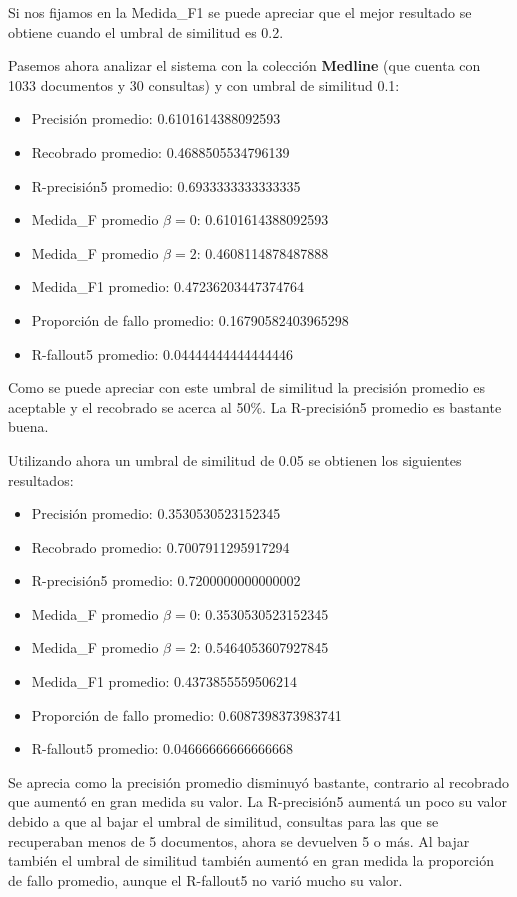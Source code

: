 \documentclass[runningheads]{llncs}
\begin{document}
Si nos fijamos en la Medida\_F1 se puede apreciar que el mejor resultado se obtiene cuando el umbral de similitud es 0.2.

Pasemos ahora analizar el sistema con la colecci\'on \textbf{Medline} (que cuenta con 1033 documentos y 30 consultas) y con umbral de similitud 0.1: 

\begin{itemize}
	\item Precisi\'on promedio:  0.6101614388092593
	\item Recobrado promedio:  0.4688505534796139
	\item R-precisi\'on5 promedio: 0.6933333333333335
	\item Medida\_F promedio  $ \beta=0 $:    0.6101614388092593
	\item Medida\_F promedio  $ \beta=2 $:  0.4608114878487888
	\item Medida\_F1 promedio:    0.47236203447374764
	\item Proporci\'on de fallo promedio: 0.16790582403965298
	\item R-fallout5 promedio:  0.04444444444444446
\end{itemize}

Como se puede apreciar con este umbral de similitud la precisi\'on promedio es aceptable y el recobrado se acerca al 50$\%$. La R-precisi\'on5 promedio es bastante buena.

Utilizando ahora un umbral de similitud de 0.05 se obtienen los siguientes resultados:

\begin{itemize}
	\item Precisi\'on promedio:  0.3530530523152345
	\item Recobrado promedio:  0.7007911295917294
	\item R-precisi\'on5 promedio:  0.7200000000000002
	\item Medida\_F promedio  $ \beta=0 $:    0.3530530523152345
	\item Medida\_F promedio  $ \beta=2 $:   0.5464053607927845
	\item Medida\_F1 promedio:    0.4373855559506214
	\item Proporci\'on de fallo promedio: 0.6087398373983741
	\item R-fallout5 promedio:  0.04666666666666668
\end{itemize}

Se aprecia como la precisi\'on promedio disminuy\'o bastante, contrario al recobrado que aument\'o en gran medida su valor. La R-precisi\'on5 aument\'a un poco su valor debido a que al bajar el umbral de similitud, consultas para las que se recuperaban menos de 5 documentos, ahora se devuelven 5 o m\'as. Al bajar tambi\'en el umbral de similitud tambi\'en aument\'o en gran medida la proporci\'on de fallo promedio, aunque el R-fallout5 no vari\'o mucho su valor.
\end{document}
